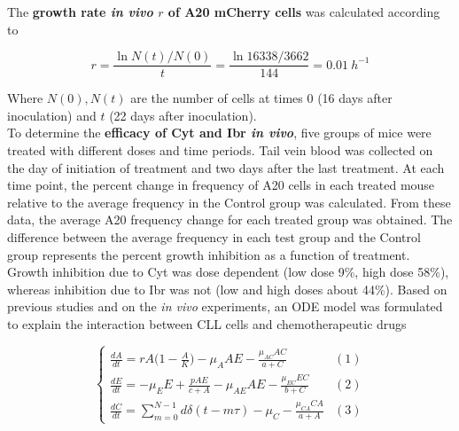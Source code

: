 The \textbf{growth rate \textit{in vivo} $r$ of A20 mCherry cells} was calculated according to

\[ r = \frac{\ln{N(t)/N(0)}}{t} = \frac{\ln{16338/3662}}{144} = 0.01\ h^{-1} \]

Where $N(0), N(t)$ are the number of cells at times $0$ (16 days after inoculation) and $t$ (22 days after inoculation).\\
To determine the \textbf{efficacy of Cyt and Ibr \textit{in vivo}}, five groups of mice were treated with different doses and time periods. Tail vein blood was collected on the day of initiation of treatment and two days after the last treatment. 
At each time point, the percent change in frequency of A20 cells in each treated mouse relative to the average frequency in the Control group was calculated. From these data, the average A20 frequency change for each treated group was obtained. 
The difference between the average frequency in each test group and the Control group represents the percent growth inhibition as a function of treatment. Growth inhibition due to Cyt was dose dependent (low dose 9\%, high dose 58\%), whereas inhibition due to Ibr was not (low and high doses about 44\%).
Based on previous studies and on the \textit{in vivo} experiments, an ODE model was formulated to explain the interaction between CLL cells and chemotherapeutic drugs

\[
\begin{cases} 
	\frac{dA}{dt} = rA \bigl( 1 - \frac{A}{K} \bigr) - \mu_A AE - \frac{\mu_{AC} AC}{a+C} & (1)\\
	\frac{dE}{dt} = -\mu_E E + \frac{pAE}{c+A} - \mu_{AE} AE - \frac{\mu_{EC} EC}{b+C} & (2) \\
	\frac{dC}{dt} = \sum_{m=0}^{N-1} d\delta (t-m\tau) - \mu_{C} - \frac{\mu_{CA} CA}{a+A} & (3) 
\end{cases}
\]

